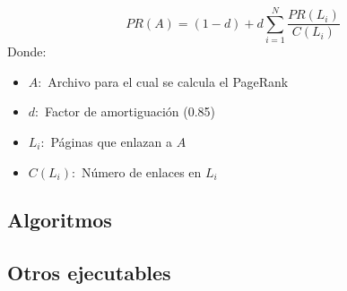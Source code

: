 \begin{equation}
PR(A)=(1-d)+d\sum_{i=1}^{N}\frac{PR(L_i)}{C(L_i)}
\end{equation}
Donde:
\begin{itemize}
\item $A:$ Archivo para el cual se calcula el PageRank
\item $d:$ Factor de amortiguación (0.85)
\item $L_i:$ Páginas que enlazan a $A$
\item $C(L_i):$ Número de enlaces en $L_i$
\end{itemize}

\subsection{Algoritmos}



\subsection{Otros ejecutables}